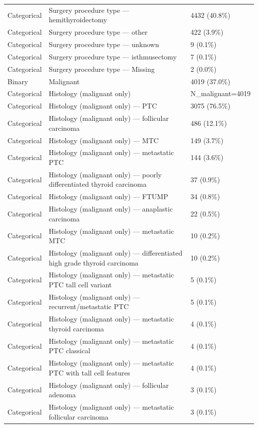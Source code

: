 \begin{table}[htbp]
\begin{tabular}{lll}
Categorical & Surgery procedure type — hemithyroidectomy & 4432 (40.8\%) \\
Categorical & Surgery procedure type — other & 422 (3.9\%) \\
Categorical & Surgery procedure type — unknown & 9 (0.1\%) \\
Categorical & Surgery procedure type — isthmusectomy & 7 (0.1\%) \\
Categorical & Surgery procedure type — Missing & 2 (0.0\%) \\
Binary & Malignant & 4019 (37.0\%) \\
Categorical & Histology (malignant only) & N\_malignant=4019 \\
Categorical & Histology (malignant only) — PTC & 3075 (76.5\%) \\
Categorical & Histology (malignant only) — follicular carcinoma & 486 (12.1\%) \\
Categorical & Histology (malignant only) — MTC & 149 (3.7\%) \\
Categorical & Histology (malignant only) — metastatic PTC & 144 (3.6\%) \\
Categorical & Histology (malignant only) — poorly differentiated thyroid carcinoma & 37 (0.9\%) \\
Categorical & Histology (malignant only) — FTUMP & 34 (0.8\%) \\
Categorical & Histology (malignant only) — anaplastic carcinoma & 22 (0.5\%) \\
Categorical & Histology (malignant only) — metastatic MTC & 10 (0.2\%) \\
Categorical & Histology (malignant only) — differentiated high grade thyroid carcinoma & 10 (0.2\%) \\
Categorical & Histology (malignant only) — metastatic PTC tall cell variant & 5 (0.1\%) \\
Categorical & Histology (malignant only) — recurrent/metastatic PTC & 5 (0.1\%) \\
Categorical & Histology (malignant only) — metastatic thyroid carcinoma & 4 (0.1\%) \\
Categorical & Histology (malignant only) — metastatic PTC classical & 4 (0.1\%) \\
Categorical & Histology (malignant only) — metastatic PTC with tall cell features & 4 (0.1\%) \\
Categorical & Histology (malignant only) — follicular adenoma & 3 (0.1\%) \\
Categorical & Histology (malignant only) — metastatic follicular carcinoma & 3 (0.1\%) \\

\end{tabular}
\end{table}
